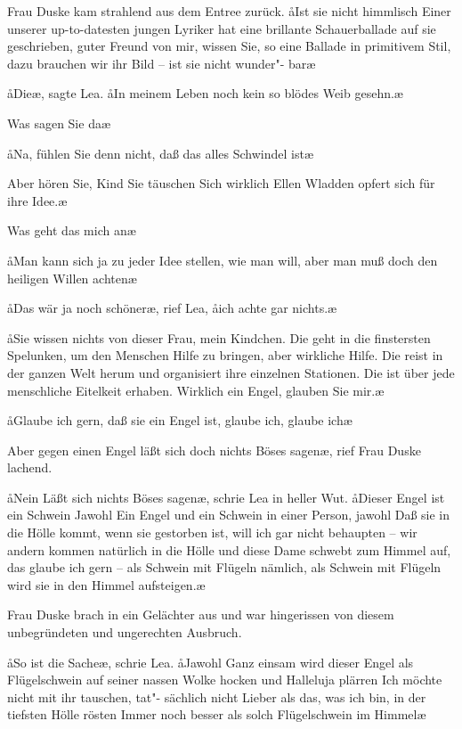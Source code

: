 Frau Duske kam strahlend aus dem Entree zurück. \aa{}Ist sie
nicht himmlisch\frag{} Einer unserer up-to-datesten jungen Lyriker
hat eine brillante Schauerballade auf sie geschrieben, guter
Freund von mir, wissen Sie, so eine Ballade in primitivem
Stil, dazu brauchen wir ihr Bild -- ist sie nicht wunder"-%
bar\frag{}\ae{}

\aa{}Die\frag{}\ae{}, sagte Lea. \aa{}In meinem Leben noch kein so blödes
Weib gesehn.\ae{}

\aanah{}Was sagen Sie da\frag{}\ae{}

\aa{}Na, fühlen Sie denn nicht, daß das alles Schwindel ist\frag{}\ae{}

\aanah{}Aber hören Sie, Kind\ausr{} Sie täuschen Sich\eingriff{eS64-1}{Sich ] sich} wirklich\ausr{} Ellen
Wladden opfert sich für ihre Idee.\ae{}

\aanah{}Was geht das mich an\ausr{}\ae{}

\aa{}Man kann sich ja zu jeder Idee stellen, wie man will, aber man
muß doch den heiligen Willen achten\ausr{}\ae{}

\aa{}Das wär ja noch schöner\ae{},\eingriff{eS65-1}{schöner\ae{}, ] schöner,\ae{}} rief Lea, \aa{}ich achte gar nichts.\ae{}

\aa{}Sie wissen nichts von dieser Frau, mein Kindchen. Die geht
in die finstersten Spelunken, um den Menschen Hilfe zu
bringen, aber wirkliche Hilfe. Die reist in der ganzen Welt
herum und organisiert ihre einzelnen Stationen. Die ist über
jede menschliche Eitelkeit erhaben. Wirklich ein Engel, glauben
Sie mir.\ae{}

\aa{}Glaube ich gern, daß sie ein Engel ist, glaube ich, glaube ich\ausr{}\ae{}

\aanah{}Aber gegen einen Engel läßt sich doch nichts Böses sagen\frag{}\ae{},
rief Frau Duske lachend.

\aa{}Nein\frag{} Läßt sich nichts Böses sagen\frag{}\ae{}, schrie Lea in heller
Wut. \aa{}Dieser Engel ist ein Schwein\ausr{} Jawohl\ausr{} Ein Engel und
ein Schwein in einer Person, jawohl\ausr{} Daß sie in die Hölle
kommt, wenn sie gestorben ist, will ich gar nicht behaupten --
wir andern kommen natürlich in die Hölle und diese Dame
schwebt zum Himmel auf, das glaube ich gern -- als Schwein
mit Flügeln nämlich, als Schwein mit Flügeln wird sie in den
Himmel aufsteigen.\ae{}

Frau Duske brach in ein Gelächter aus und war hingerissen
von diesem unbegründeten und ungerechten Ausbruch.

\aa{}So ist die Sache\ausr{}\ae{}, schrie Lea. \aa{}Jawohl\ausr{} Ganz einsam wird
dieser Engel als Flügelschwein auf seiner nassen Wolke hocken
und Halleluja plärren\ausr{} Ich möchte nicht mit ihr tauschen, tat"-%
sächlich nicht\ausr{} Lieber als das, was ich bin, in der tiefsten Hölle
rösten\ausr{} Immer noch besser als solch Flügelschwein im
Himmel\ausr{}\ae{}

